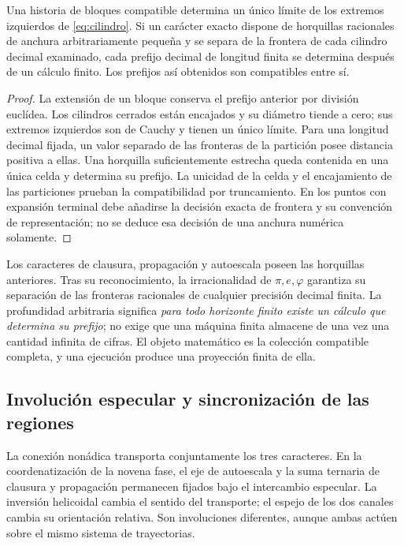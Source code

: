 \begin{theorem}
Una historia de bloques compatible determina un único límite de los extremos izquierdos de \eqref{eq:cilindro}. Si un carácter exacto dispone de horquillas racionales de anchura arbitrariamente pequeña y se separa de la frontera de cada cilindro decimal examinado, cada prefijo decimal de longitud finita se determina después de un cálculo finito. Los prefijos así obtenidos son compatibles entre sí.
\end{theorem}
\begin{proof}
La extensión de un bloque conserva el prefijo anterior por división euclídea. Los cilindros cerrados están encajados y su diámetro tiende a cero; sus extremos izquierdos son de Cauchy y tienen un único límite. Para una longitud decimal fijada, un valor separado de las fronteras de la partición posee distancia positiva a ellas. Una horquilla suficientemente estrecha queda contenida en una única celda y determina su prefijo. La unicidad de la celda y el encajamiento de las particiones prueban la compatibilidad por truncamiento. En los puntos con expansión terminal debe añadirse la decisión exacta de frontera y su convención de representación; no se deduce esa decisión de una anchura numérica solamente.
\end{proof}

Los caracteres de clausura, propagación y autoescala poseen las horquillas anteriores. Tras su reconocimiento, la irracionalidad de \(\pi,e,\varphi\) garantiza su separación de las fronteras racionales de cualquier precisión decimal finita. La profundidad arbitraria significa \emph{para todo horizonte finito existe un cálculo que determina su prefijo}; no exige que una máquina finita almacene de una vez una cantidad infinita de cifras. El objeto matemático es la colección compatible completa, y una ejecución produce una proyección finita de ella.

\subsection{Involución especular y sincronización de las regiones}

La conexión nonádica transporta conjuntamente los tres caracteres. En la coordenatización de la novena fase, el eje de autoescala y la suma ternaria de clausura y propagación permanecen fijados bajo el intercambio especular. La inversión helicoidal cambia el sentido del transporte; el espejo de los dos canales cambia su orientación relativa. Son involuciones diferentes, aunque ambas actúen sobre el mismo sistema de trayectorias.

